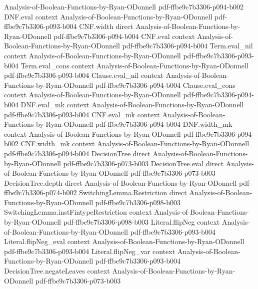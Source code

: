 \begin{theorem}
  {Analysis-of-Boolean-Functions-by-Ryan-ODonnell}
  {pdf-ffbe9c7b3306-p094-b002}
\proofstep
  {DNF.eval}
  {context}
  {Analysis-of-Boolean-Functions-by-Ryan-ODonnell}
  {pdf-ffbe9c7b3306-p093-b004}
\proofstep
  {CNF.width}
  {direct}
  {Analysis-of-Boolean-Functions-by-Ryan-ODonnell}
  {pdf-ffbe9c7b3306-p094-b004}
\proofstep
  {CNF.eval}
  {context}
  {Analysis-of-Boolean-Functions-by-Ryan-ODonnell}
  {pdf-ffbe9c7b3306-p094-b004}
\proofstep
  {Term.eval_nil}
  {context}
  {Analysis-of-Boolean-Functions-by-Ryan-ODonnell}
  {pdf-ffbe9c7b3306-p093-b004}
\proofstep
  {Term.eval_cons}
  {context}
  {Analysis-of-Boolean-Functions-by-Ryan-ODonnell}
  {pdf-ffbe9c7b3306-p093-b004}
\proofstep
  {Clause.eval_nil}
  {context}
  {Analysis-of-Boolean-Functions-by-Ryan-ODonnell}
  {pdf-ffbe9c7b3306-p094-b004}
\proofstep
  {Clause.eval_cons}
  {context}
  {Analysis-of-Boolean-Functions-by-Ryan-ODonnell}
  {pdf-ffbe9c7b3306-p094-b004}
\proofstep
  {DNF.eval_mk}
  {context}
  {Analysis-of-Boolean-Functions-by-Ryan-ODonnell}
  {pdf-ffbe9c7b3306-p093-b004}
\proofstep
  {CNF.eval_mk}
  {context}
  {Analysis-of-Boolean-Functions-by-Ryan-ODonnell}
  {pdf-ffbe9c7b3306-p094-b004}
\proofstep
  {DNF.width_mk}
  {context}
  {Analysis-of-Boolean-Functions-by-Ryan-ODonnell}
  {pdf-ffbe9c7b3306-p094-b002}
\proofstep
  {CNF.width_mk}
  {context}
  {Analysis-of-Boolean-Functions-by-Ryan-ODonnell}
  {pdf-ffbe9c7b3306-p094-b004}
\proofstep
  {DecisionTree}
  {direct}
  {Analysis-of-Boolean-Functions-by-Ryan-ODonnell}
  {pdf-ffbe9c7b3306-p073-b003}
\proofstep
  {DecisionTree.eval}
  {direct}
  {Analysis-of-Boolean-Functions-by-Ryan-ODonnell}
  {pdf-ffbe9c7b3306-p073-b003}
\proofstep
  {DecisionTree.depth}
  {direct}
  {Analysis-of-Boolean-Functions-by-Ryan-ODonnell}
  {pdf-ffbe9c7b3306-p074-b002}
\proofstep
  {SwitchingLemma.Restriction}
  {direct}
  {Analysis-of-Boolean-Functions-by-Ryan-ODonnell}
  {pdf-ffbe9c7b3306-p098-b003}
\proofstep
  {SwitchingLemma.instFintypeRestriction}
  {context}
  {Analysis-of-Boolean-Functions-by-Ryan-ODonnell}
  {pdf-ffbe9c7b3306-p098-b003}
\proofstep
  {Literal.flipNeg}
  {context}
  {Analysis-of-Boolean-Functions-by-Ryan-ODonnell}
  {pdf-ffbe9c7b3306-p093-b004}
\proofstep
  {Literal.flipNeg_eval}
  {context}
  {Analysis-of-Boolean-Functions-by-Ryan-ODonnell}
  {pdf-ffbe9c7b3306-p093-b004}
\proofstep
  {Literal.flipNeg_var}
  {context}
  {Analysis-of-Boolean-Functions-by-Ryan-ODonnell}
  {pdf-ffbe9c7b3306-p093-b004}
\proofstep
  {DecisionTree.negateLeaves}
  {context}
  {Analysis-of-Boolean-Functions-by-Ryan-ODonnell}
  {pdf-ffbe9c7b3306-p073-b003}
\proofstep

\end{theorem}
